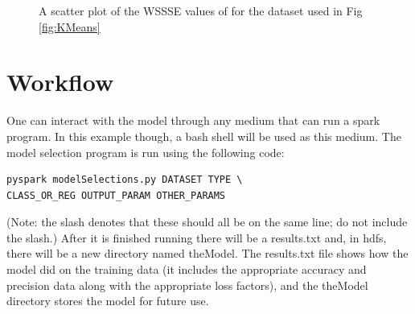 \documentclass[9pt,twocolumn,twoside]{idsi}
\begin{document}
\begin{figure}[h!tbp]
\centering
{}
\caption{A scatter plot of the WSSSE values of for the dataset used in Fig \ref{fig:KMeans}}
\label{fig:WSSSE}
\end{figure}

\section{Workflow}
One can interact with the model through any medium that can run a spark program. In this example though, a bash shell will be used as this medium. The model selection program is run using the following code:
\begin{lstlisting}
pyspark modelSelections.py DATASET TYPE \
CLASS_OR_REG OUTPUT_PARAM OTHER_PARAMS
\end{lstlisting}
(Note: the slash denotes that these should all be on the same line; do not include the slash.)
After it is finished running there will be a results.txt and, in hdfs, there will be a new directory named theModel. The results.txt file shows how the model did on the training data (it includes the appropriate accuracy and precision data along with the appropriate loss factors), and the theModel directory stores the model for future use.
\end{document}
